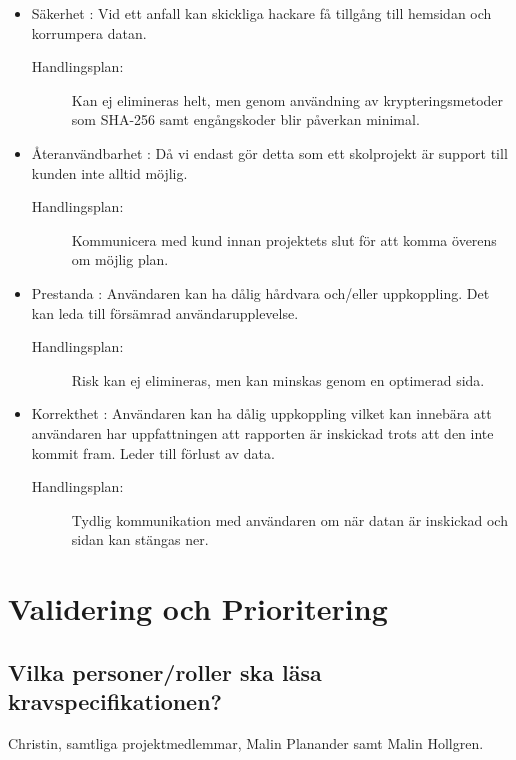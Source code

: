 \documentclass{article}
\begin{document}
\begin{itemize}
    \item Säkerhet : Vid ett anfall kan skickliga hackare få tillgång till hemsidan och korrumpera datan.
    \begin{description}
          \item[Handlingsplan:] Kan ej elimineras helt, men genom användning av krypteringsmetoder som SHA-256 samt engångskoder blir påverkan minimal.
    \end{description}
    \item Återanvändbarhet : Då vi endast gör detta som ett skolprojekt är support till kunden inte alltid möjlig.
    \begin{description}
          \item[Handlingsplan:] Kommunicera med kund innan projektets slut för att komma överens om möjlig plan.
    \end{description}
    \item Prestanda : Användaren kan ha dålig hårdvara och/eller uppkoppling. Det kan leda till försämrad användarupplevelse.
    \begin{description}
          \item[Handlingsplan:] Risk kan ej elimineras, men kan minskas genom en optimerad sida.
    \end{description}
    \item Korrekthet : Användaren kan ha dålig uppkoppling vilket kan innebära att användaren har uppfattningen att rapporten är inskickad trots att den inte kommit fram. Leder till förlust av data.
    \begin{description}
          \item[Handlingsplan:] Tydlig kommunikation med användaren om när datan är inskickad och sidan kan stängas ner.
    \end{description}
\end{itemize}

\section{Validering och Prioritering}
\subsection {Vilka personer/roller ska läsa kravspecifikationen?}
Christin, samtliga projektmedlemmar, Malin Planander samt Malin Hollgren.
\end{document}
